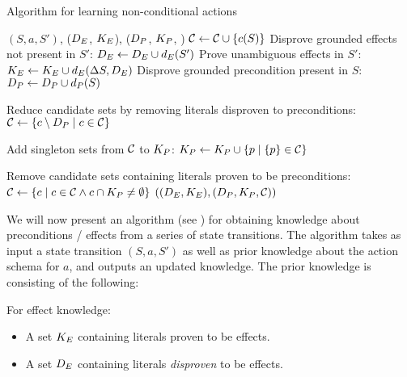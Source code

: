 \documentclass[\master/Master.tex]{subfiles}
\begin{document}
\begin{algorithm}
	\caption{Algorithm for learning non-conditional actions}\label{algo:precondLearn}
	\begin{algorithmic}
		 {$\left(S, a, S'\right)$, ($D_E$, $K_E$), ($D_P$, $K_P$, \cset)}
		\State $\mathcal{C} \gets \mathcal{C} \cup \{ c(S) \}$
		\State Disprove grounded effects not present in $S'$:
		\State $D_E \gets D_E \cup d_E(S')$
		\State Prove unambiguous effects in $S'$:
		\State $K_E \gets K_E \cup d_E(\Delta S,D_E)$
		\State Disprove grounded precondition present in $S$:
		\State $D_P \gets D_P \cup d_P(S)$
		\EndIf		
		
		\State Reduce candidate sets by removing literals disproven to preconditions:
		\State $\mathcal{C} \gets \left\{ c \setminus D_P \; | \; c \in \mathcal{C} \right\}$
		
		\State Add singleton sets from $\mathcal{C}$ to $K_P$:
		\State $K_P \gets K_P \cup \left\{ p \; | \; \{ p \} \in \mathcal{C} \right\}$
		
		\State Remove candidate sets containing literals proven to be preconditions:
		\State $\mathcal{C} \gets \left\{ c \; | \; c \in \mathcal{C} \land c \cap K_P \neq \emptyset \right\}$
		\State \Return $((D_E, K_E), (D_P, K_P, \mathcal{C}))$
		\EndFunction%
	\end{algorithmic}
\end{algorithm}

We will now present an algorithm (see ) for obtaining knowledge about preconditions / effects from a series of state transitions. 
The algorithm takes as input a state transition $(S, a, S')$ as well as prior knowledge about the action schema for $a$, and outputs an updated knowledge.
The prior knowledge is consisting of the following:

For effect knowledge:
\begin{itemize}
	\item A set $K_E$ containing literals proven to be effects.
	\item A set $D_E$ containing literals \emph{disproven} to be effects.
\end{itemize}
\end{document}
